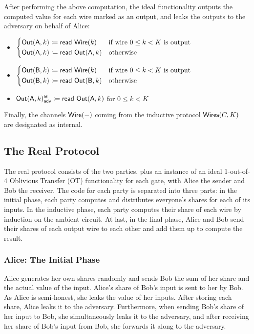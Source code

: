 \noindent After performing the above computation, the ideal functionality outputs the computed value for each wire marked as an output, and leaks the outputs to the adversary on behalf of Alice:

\begin{itemize}
\item $\begin{cases*} \Out(\A,k) \coloneqq \read{\Wire(k)} & \text{if wire $0 \leq k < K$ is output} \\ \Out(\A,k) \coloneqq \read{\Out(\A,k)} & \text{otherwise} \end{cases*}$
\item $\begin{cases*} \Out(\B,k) \coloneqq \read{\Wire(k)} & \text{if wire $0 \leq k < K$ is output} \\ \Out(\B,k) \coloneqq \read{\Out(\B,k)} & \text{otherwise} \end{cases*}$
\item {\color{blue} $\mathsf{Out}(\mathsf{A},k)^{\mathsf{id}}_{\mathsf{adv}} \coloneqq \mathsf{read} \ \mathsf{Out}(\mathsf{A},k)$ for $0 \leq k < K$}
\end{itemize}

\noindent Finally, the channels $\mathsf{Wire}(-)$ coming from the inductive protocol $\mathsf{Wires}(C,K)$ are designated as internal.

\subsection{The Real Protocol}
The real protocol consists of the two parties, plus an instance of an ideal 1-out-of-4 Oblivious Transfer (OT) functionality for each gate, with Alice the sender and Bob the receiver. The code for each party is separated into three parts: in the initial phase, each party computes and distributes everyone's shares for each of its inputs. In the inductive phase, each party computes their share of each wire by induction on the ambient circuit. At last, in the final phase, Alice and Bob send their shares of each output wire to each other and add them up to compute the result.

\subsubsection{Alice: The Initial Phase}
Alice generates her own shares randomly and sends Bob the sum of her share and the actual value of the input. Alice's share of Bob's input is sent to her by Bob. As Alice is semi-honest, she leaks the value of her inputs. After storing each share, Alice leaks it to the adversary. Furthermore, when sending Bob's share of her input to Bob, she simultaneously leaks it to the adversary, and after receiving her share of Bob's input from Bob, she forwards it along to the adversary.

